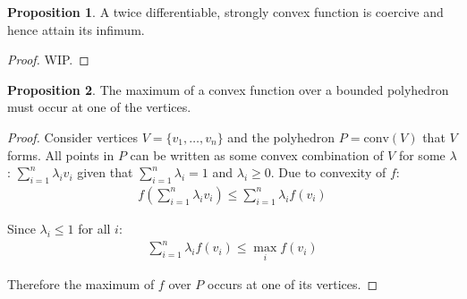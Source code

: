 \documentclass[12pt]{article}
\newcommand{\conv}{\text{conv}}
\theoremstyle{definition}
\newtheorem{prop}{Proposition}[section]
\begin{document}
	\begin{prop}
		A twice differentiable, strongly convex function is coercive and hence attain its infimum.
	\end{prop}
	
	\begin{proof}
		WIP.
	\end{proof}
	
	\begin{prop}
		The maximum of a convex function over a bounded polyhedron must occur at one of the vertices.
	\end{prop}
	
	\begin{proof}
		Consider vertices $V = \{v_1, \dots, v_n\}$ and the polyhedron $P = \conv(V)$ that $V$ forms. All points in $P$ can be written as some convex combination of $V$ for some $\lambda$: $\sum^n_{i=1} \lambda_i v_i$ given that $\sum^n_{i = 1} \lambda_i = 1$ and $\lambda_i \geq 0$. Due to convexity of $f$:
		\begin{gather*}
			f(\sum^n_{i=1} \lambda_i v_i) \leq \sum^n_{i=1} \lambda_i f(v_i)
		\end{gather*}
		
		Since $\lambda_i \leq 1$ for all $i$:
		\begin{gather*}
			\sum^n_{i=1} \lambda_i f(v_i) \leq \max_i f(v_i)
		\end{gather*}
		
		Therefore the maximum of $f$ over $P$ occurs at one of its vertices.
	\end{proof}
	
\end{document}
